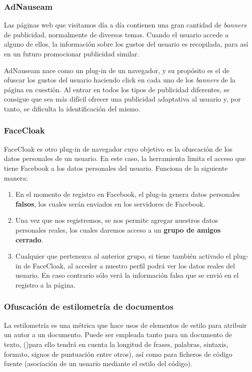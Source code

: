 \subsubsection{AdNauseam}

Las páginas web que visitamos día a día contienen una gran cantidad de \textit{banners} de publicidad, normalmente de diversos temas. Cuando el usuario accede a alguno de ellos, la información sobre los gustos del usuario es recopilada, para así en un futuro promocionar publicidad similar. 

AdNauseam nace como un plug-in de un navegador, y su propósito es el de ofuscar los gustos del usuario haciendo click en cada uno de los \textit{banners} de la página en cuestión. Al entrar en todos los tipos de publicidad diferentes, se consigue que sea más difícil ofrecer una publicidad adaptativa al usuario y, por tanto, se dificulta la identificación del mismo.

\subsubsection{FaceCloak}

FaceCloak es otro plug-in de navegador cuyo objetivo es la ofuscación de los datos personales de un usuario. En este caso, la herramienta limita el acceso que tiene Facebook a los datos personales del usuario. Funciona de la siguiente manera:

\begin{enumerate}
	\item En el momento de registro en Facebook, el plug-in genera datos personales \textbf{falsos}, los cuales serán enviados en los servidores de Facebook.
	\item Una vez que nos registremos, se nos permite agregar nuestros datos personales reales, los cuales daremos acceso a un \textbf{grupo de amigos cerrado}.
	\item Cualquier que pertenezca al anterior grupo, si tiene también activado el plug-in de FaceCloak, al acceder a nuestro perfil podrá ver los datos reales del usuario. En caso contrario sólo verá la información falsa que se envió en el registro a la página.
\end{enumerate}

\subsubsection{Ofuscación de estilometría de documentos}

La estilometría es una métrica que hace usos de elementos de estilo para atribuir un autor a un documento. Puede ser empleada tanto para un documento de texto, ()para ello tendrá en cuenta la longitud de frases, palabras, sintaxis, formato, signos de puntuación entre otros), así como para ficheros de código fuente (asociación de un usuario mediante el estilo del código). 

